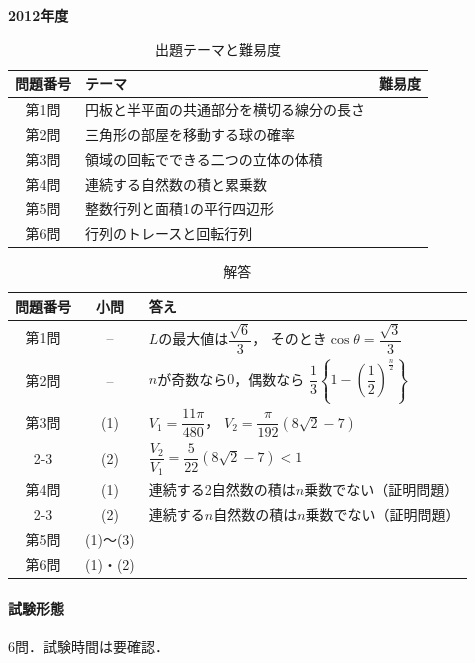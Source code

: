 \documentclass[../../main.tex]{subfiles}
\begin{document}
\begin{center}
  {\fontsize{48pt}{58pt}\selectfont \textbf{2012}\normalsize\textbf{年度}}
\end{center}

\begin{table}[htb]
  \centering
  \caption{出題テーマと難易度}
  \begin{tabular}{|c|p{9cm}|c|}
    \hline
    \textbf{問題番号} & \textbf{テーマ} & \textbf{難易度} \\
    \hline
    第1問 & 円板と半平面の共通部分を横切る線分の長さ & \\
    \hline
    第2問 & 三角形の部屋を移動する球の確率 & \\
    \hline
    第3問 & 領域の回転でできる二つの立体の体積 & \\
    \hline
    第4問 & 連続する自然数の積と累乗数 & \\
    \hline
    第5問 & 整数行列と面積1の平行四辺形 & \\
    \hline
    第6問 & 行列のトレースと回転行列 & \\
    \hline
  \end{tabular}
\end{table}

\begin{table}[htb]
  \centering
  \caption{解答}
  \renewcommand{\arraystretch}{1.4}
  \begin{tabular}{|c|c|p{9cm}|}
    \hline
    \textbf{問題番号} & \textbf{小問} & \textbf{答え} \\
    \hline
    第1問 & -- & $L$の最大値は$\dfrac{\sqrt{6}}{3}$，
    そのとき$\cos\theta=\dfrac{\sqrt{3}}{3}$ \\
    \hline
    第2問 & -- & $n$が奇数なら$0$，偶数なら
    $\dfrac{1}{3}\left\{1-\left(\dfrac{1}{2}\right)^{\frac{n}{2}}\right\}$ \\
    \hline
    第3問 & (1) & $V_1=\dfrac{11\pi}{480}$，
    $V_2=\dfrac{\pi}{192}(8\sqrt{2}-7)$ \\
    \cline{2-3}
    & (2) & $\dfrac{V_2}{V_1}=\dfrac{5}{22}(8\sqrt{2}-7)<1$ \\
    \hline
    第4問 & (1) & 連続する2自然数の積は$n$乗数でない（証明問題） \\
    \cline{2-3}
    & (2) & 連続する$n$自然数の積は$n$乗数でない（証明問題） \\
    \hline
    第5問 & (1)〜(3) & \\
    \hline
    第6問 & (1)・(2) & \\
    \hline
  \end{tabular}
\end{table}

\paragraph{試験形態}
6問．試験時間は要確認．
\end{document}

